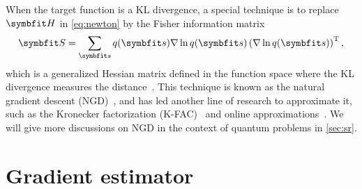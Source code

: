 When the target function is a KL divergence, a special technique is to replace $\mH$ in \cref{eq:newton} by the Fisher information matrix
\begin{equation}
\mS = \sum_\vs q(\vs) \nabla \ln q(\vs) \left( \nabla \ln q(\vs) \right)^\transpose,
\end{equation}
which is a generalized Hessian matrix defined in the function space where the KL divergence measures the distance~\cite{martens2020new}. This technique is known as the natural gradient descent (NGD)~\cite{amari1998natural}, and has led another line of research to approximate it, such as the Kronecker factorization (K-FAC)~\cite{martens2015optimizing} and online approximations~\cite{roux2007topmoumoute, ollivier2017true}. We will give more discussions on NGD in the context of quantum problems in \cref{sec:sr}.

\section{Gradient estimator}

